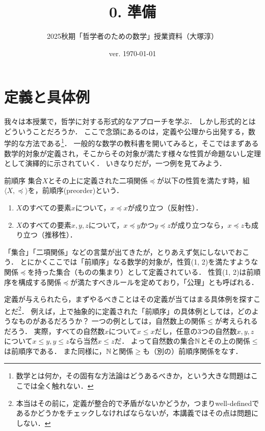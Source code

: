 \documentclass[11pt,a4paper]{jsarticle}
\begin{document}
\title{0. 準備}
\author{2025秋期「哲学者のための数学」授業資料（大塚淳）}
\date{ver. \today}
\maketitle



\section{定義と具体例}
我々は本授業で，哲学に対する形式的なアプローチを学ぶ．
しかし形式的とはどういうことだろうか．
ここで念頭にあるのは，定義や公理から出発する，数学的な方法である\footnote{数学とは何か，その固有な方法論はどうあるべきか，という大きな問題はここでは全く触れない．}．
一般的な数学の教科書を開いてみると，そこではまずある数学的対象が定義され，そこからその対象が満たす様々な性質が命題ないし定理として演繹的に示されていく．
いきなりだが，一つ例を見てみよう．

\begin{dfn}{前順序}
 集合$X$とその上に定義された二項関係$\preceq$が以下の性質を満たす時，組$\langle X, \preceq \rangle$を，前順序(preorder)という．
\begin{enumerate}
 \item $X$のすべての要素$x$について，$x \preceq x$が成り立つ（反射性）．
 \item $X$のすべての要素$x, y, z$について，$x \preceq y$かつ$y \preceq z$が成り立つなら，$x \preceq z$も成り立つ（推移性）．
\end{enumerate}
\end{dfn}

「集合」「二項関係」などの言葉が出てきたが，とりあえず気にしないでおこう．
とにかくここでは「前順序」なる数学的対象が，性質(1, 2)を満たすような関係$\preceq$を持った集合（ものの集まり）として定義されている．
性質(1, 2)は前順序を構成する関係$\preceq$が満たすべきルールを定めており，「公理」とも呼ばれる．

定義が与えられたら，まずやるべきことはその定義が当てはまる具体例を探すことだ\footnote{本当はその前に，定義が整合的で矛盾がないかどうか，つまりwell-definedであるかどうかをチェックしなければならないが，本講義ではその点は問題にしない．}．
例えば，上で抽象的に定義された「前順序」の具体例としては，どのようなものがあるだろうか？
一つの例としては，自然数上の関係$\leq$が考えられるだろう．
実際，すべての自然数$x$について$x \leq x$だし，任意の3つの自然数$x, y, z$について$x \leq y, y \leq z$なら当然$x \leq z$だ．
よって自然数の集合$\mathbb{N}$とその上の関係$\leq$は前順序である．
また同様に，$\mathbb{N}$と関係$\geq$も（別の）前順序関係をなす．
\end{document}

